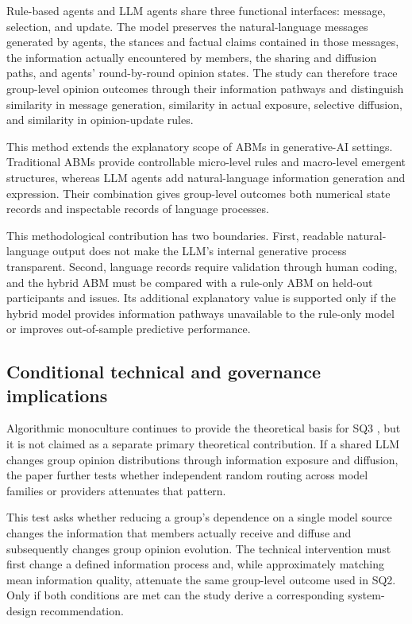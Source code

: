 \documentclass[11pt,a4paper]{article}
\begin{document}
Rule-based agents and LLM agents share three functional interfaces: message, selection, and update. The model preserves the natural-language messages generated by agents, the stances and factual claims contained in those messages, the information actually encountered by members, the sharing and diffusion paths, and agents' round-by-round opinion states. The study can therefore trace group-level opinion outcomes through their information pathways and distinguish similarity in message generation, similarity in actual exposure, selective diffusion, and similarity in opinion-update rules.

This method extends the explanatory scope of ABMs in generative-AI settings. Traditional ABMs provide controllable micro-level rules and macro-level emergent structures, whereas LLM agents add natural-language information generation and expression. Their combination gives group-level outcomes both numerical state records and inspectable records of language processes.

This methodological contribution has two boundaries. First, readable natural-language output does not make the LLM's internal generative process transparent. Second, language records require validation through human coding, and the hybrid ABM must be compared with a rule-only ABM on held-out participants and issues. Its additional explanatory value is supported only if the hybrid model provides information pathways unavailable to the rule-only model or improves out-of-sample predictive performance.

\subsection{Conditional technical and governance implications}

Algorithmic monoculture continues to provide the theoretical basis for SQ3 \cite{kleinberg2021}, but it is not claimed as a separate primary theoretical contribution. If a shared LLM changes group opinion distributions through information exposure and diffusion, the paper further tests whether independent random routing across model families or providers attenuates that pattern.

This test asks whether reducing a group's dependence on a single model source changes the information that members actually receive and diffuse and subsequently changes group opinion evolution. The technical intervention must first change a defined information process and, while approximately matching mean information quality, attenuate the same group-level outcome used in SQ2. Only if both conditions are met can the study derive a corresponding system-design recommendation.
\end{document}
